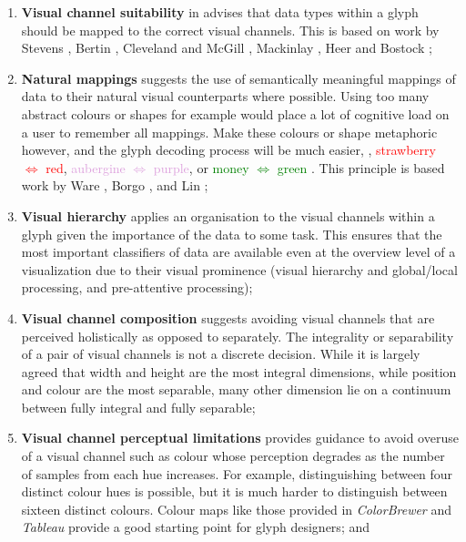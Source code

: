 \begin{enumerate}

\item \textbf{Visual channel suitability} in advises that data types within a glyph should be mapped to the correct visual channels.
This is based on work by Stevens \cite{stevens1975}, Bertin \cite{Bertin:1983:book}, Cleveland and McGill \cite{cleveland1984graphical}, Mackinlay \cite{mackinlay1986automating}, Heer and Bostock \cite{heer2010crowdsourcing};

\item \textbf{Natural mappings} suggests the use of semantically meaningful mappings of data to their natural visual counterparts where possible.
Using too many abstract colours or shapes for example would place a lot of cognitive load on a user to remember all mappings.
Make these colours or shape metaphoric however, and the glyph decoding process will be much easier, \eg, \textcolor{Red}{strawberry $\Leftrightarrow$ red}, \textcolor{Plum}{aubergine $\Leftrightarrow$ purple}, or \textcolor{Green}{money $\Leftrightarrow$ green} \cite{lin2013selecting}.
This principle is based work by Ware \cite{ware2010visual, ware13}, Borgo \etal \cite{Borgo12}, and Lin \etal \cite{lin2013selecting};

\item \textbf{Visual hierarchy} applies an organisation to the visual channels within a glyph given the importance of the data to some task.
This ensures that the most important classifiers of data are available even at the overview level of a visualization due to their visual prominence (visual hierarchy and global/local processing, and pre-attentive processing);

\item \textbf{Visual channel composition} suggests avoiding visual channels that are perceived holistically as opposed to separately.
The integrality or separability of a pair of visual channels is not a discrete decision.
While it is largely agreed that width and height are the most integral dimensions, while position and colour are the most separable, many other dimension lie on a continuum between fully integral and fully separable; 

\item \textbf{Visual channel perceptual limitations} provides guidance to avoid overuse of a visual channel such as colour whose perception degrades as the number of samples from each hue increases.
For example, distinguishing between four distinct colour hues is possible, but it is much harder to distinguish between sixteen distinct colours.
Colour maps like those provided in \emph{ColorBrewer} \cite{ColorBrewer} and \emph{Tableau} \cite{tableau_palettes} provide a good starting point for glyph designers; and


\end{enumerate}
